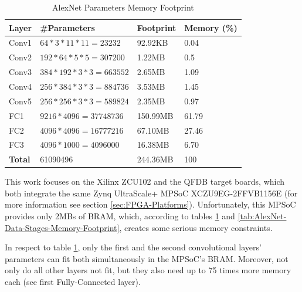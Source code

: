\begin{table}[H]
	\caption{AlexNet Parameters Memory Footprint}
	\label{tab:AlexNet-Parameters-Memory-Footprint}
	\centering
	\begin{tabular}{llll}
		\toprule
		\textbf{Layer} & \textbf{\#Parameters} & \textbf{Footprint} & \textbf{Memory (\%)}  \\
		\midrule
			Conv1 & $64 * 3 * 11 * 11 = 23232$ & 92.92KB & 0.04 \\
			Conv2 & $192 * 64 * 5 * 5 = 307200$ & 1.22MB & 0.5 \\
			Conv3 & $384 * 192 * 3 * 3 = 663552$ & 2.65MB & 1.09 \\
			Conv4 & $256 * 384 * 3 * 3 = 884736$ & 3.53MB & 1.45 \\
			Conv5 & $256 * 256 * 3 * 3 = 589824$ & 2.35MB & 0.97 \\
			FC1 & $9216 * 4096 = 37748736$ & 150.99MB & 61.79 \\
			FC2 & $4096 * 4096 = 16777216$ & 67.10MB & 27.46 \\
			FC3 & $4096 * 1000 = 4096000$ & 16.38MB & 6.70 \\
		\midrule
			\textbf{Total} & 61090496 & 244.36MB & 100 \\
		\bottomrule
	\end{tabular}
\end{table}

This work focuses on the Xilinx ZCU102 \cite{ZCU102-User-Guide} \cite{ZCU102-Product-Overview} and the QFDB \cite{Implementation-and-Impact-of-an-Ultra-Compact-Multi-FPGA-Board-for-Large-System-Prototyping} target boards, which both integrate the same Zynq UltraScale+ MPSoC XCZU9EG-2FFVB1156E (for more information see section \ref{sec:FPGA-Platforms}). Unfortunately, this MPSoC provides only 2MBs of BRAM, which, according to tables \ref{tab:AlexNet-Parameters-Memory-Footprint} and \ref{tab:AlexNet-Data-Stages-Memory-Footprint}, creates some serious memory constraints.

In respect to table \ref{tab:AlexNet-Parameters-Memory-Footprint}, only the first and the second convolutional layers' parameters can fit both simultaneously in the MPSoC's BRAM. Moreover, not only do all other layers not fit, but they also need up to 75 times more memory each (see first Fully-Connected layer).

